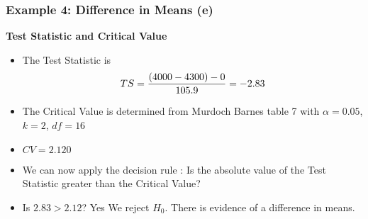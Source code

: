 \begin{frame}
\frametitle{Example 4: Difference in Means (e) }
\textbf{Test Statistic and Critical Value}\\
\begin{itemize}
\item The Test Statistic is \[ TS  = {(4000-4300) - 0 \over 105.9}  = -2.83 \]
\item The Critical Value is determined from Murdoch Barnes table 7 with $\alpha = 0.05$, $k=2$, $df = 16 $
\item $CV = 2.120$
\item We can now apply the decision rule : Is the absolute value of the Test Statistic greater than the Critical Value?
\item Is $2.83 > 2.12$? Yes We reject $H_0$. There is evidence of a difference in means.
\end{itemize}
\end{frame}



